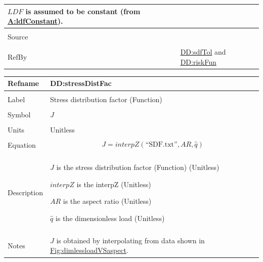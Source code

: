 \documentclass[12pt]{article}
\begin{document}
\begin{minipage}{\textwidth}
\begin{tabular}{>{\raggedright}p{}>{\raggedright\arraybackslash}p{}}
        $\mathit{LDF}$ is assumed to be constant (from \hyperref[assumpLDFC]{A:ldfConstant}).
        
\\ \midrule \\
Source & \cite{astm2009}
         
\\ \midrule \\
RefBy & \hyperref[DD:sdfTol]{DD:sdfTol} and \hyperref[DD:riskFun]{DD:riskFun}
        
\\ \bottomrule
\end{tabular}
\end{minipage}

\vspace{\baselineskip}
\noindent
\begin{minipage}{\textwidth}
\begin{tabular}{>{\raggedright}p{}>{\raggedright\arraybackslash}p{}}
\toprule \textbf{Refname} & \textbf{DD:stressDistFac}
\label{DD:stressDistFac}
\\ \midrule \\
Label & Stress distribution factor (Function)
        
\\ \midrule \\
Symbol & $J$
         
\\ \midrule \\
Units & Unitless
        
\\ \midrule \\
Equation & \begin{displaymath}
           J=\mathit{interpZ}\left(\text{``SDF.txt''},\mathit{AR},\hat{q}\right)
           \end{displaymath}
\\ \midrule \\
Description & \begin{symbDescription}
              \item{$J$ is the stress distribution factor (Function) (Unitless)}
              \item{$\mathit{interpZ}$ is the interpZ (Unitless)}
              \item{$\mathit{AR}$ is the aspect ratio (Unitless)}
              \item{$\hat{q}$ is the dimensionless load (Unitless)}
              \end{symbDescription}
\\ \midrule \\
Notes & $J$ is obtained by interpolating from data shown in \hyperref[Figure:dimlessloadVSaspect]{Fig:dimlessloadVSaspect}.
        

\end{tabular}
\end{minipage}
\end{document}
